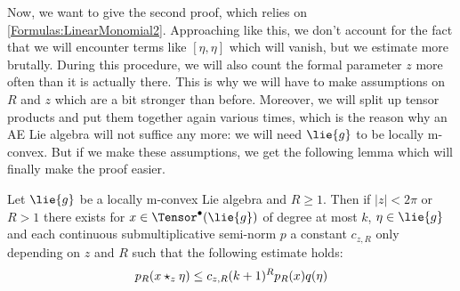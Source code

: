 Now, we want to give the second proof, which relies on 
\eqref{Formulas:LinearMonomial2}. Approaching like this, we don't account for 
the fact that we will encounter terms like $[\eta, \eta]$ which will vanish, 
but we estimate more brutally. During this procedure, we will also count the 
formal parameter $z$ more often than it is actually there. This is why we will 
have to make assumptions on $R$ and $z$ which are a bit stronger than before. 
Moreover, we will split up tensor products and put them together again various 
times, which is the reason why an AE Lie algebra will not suffice any more: we 
will need $\lie{g}$ to be locally m-convex. But if we make these assumptions, 
we get the following lemma which will finally make the proof easier.
\begin{lemma}
    \label{Lemma:LCAna:PreContinuity2}%
    Let $\lie{g}$ be a locally m-convex Lie algebra and $R \geq1$. 
    Then if $|z| < 2 \pi$ or $R >1$ there exists for $x \in
    \Tensor^{\bullet}(\lie{g})$ of degree at most $k$, $\eta \in \lie{g}$
    and each continuous submultiplicative semi-norm $p$ a constant $c_{z,R}$ 
    only depending on $z$ and $R$ such that the following estimate holds:
    \begin{equation}
        \label{LCAna:PreContinuity2}
        p_R(x \star_z \eta)
        \leq
        c_{z,R} (k+1)^R p_R(x) q(\eta)
    \end{equation}
\end{lemma}
